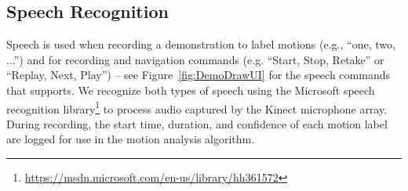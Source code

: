 




\subsection{Speech Recognition}
Speech is used when recording a demonstration to label motions (e.g., ``one, two, ...'') and for recording and navigation commands (e.g. ``Start, Stop, Retake'' or ``Replay, Next, Play'') -- see Figure~\ref{fig:DemoDrawUI} for the speech commands that \systemname{} supports.
%
We recognize both types of speech using the Microsoft speech recognition library\footnote{\url{https://msdn.microsoft.com/en-us/library/hh361572}} to process audio captured by the Kinect microphone array.
During recording, the start time, duration, and confidence of each motion label are logged for use in the motion analysis algorithm.

